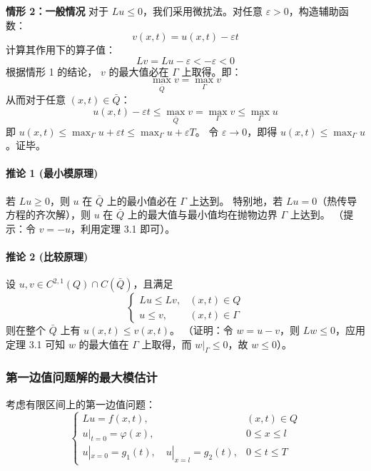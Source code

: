 \documentclass[12pt,a4paper]{ctexart}
\begin{document}
	\textbf{情形 2：一般情况}
	对于 $Lu \leqslant 0$，我们采用微扰法。对任意 $\varepsilon > 0$，构造辅助函数：
	\[
	v(x,t) = u(x,t) - \varepsilon t
	\]
	计算其作用下的算子值：
	\[
	Lv = Lu - \varepsilon < -\varepsilon < 0
	\]
	根据情形 1 的结论， $v$ 的最大值必在 $\Gamma$ 上取得。即：
	\[
	\max_{\bar{Q}} v = \max_{\Gamma} v
	\]
	从而对于任意 $(x,t) \in \bar{Q}$：
	\[
	u(x,t) - \varepsilon t \leqslant \max_{\bar{Q}} v = \max_{\Gamma} v \leqslant \max_{\Gamma} u
	\]
	即 $u(x,t) \leqslant \max_{\Gamma} u + \varepsilon t \leqslant \max_{\Gamma} u + \varepsilon T$。
	令 $\varepsilon \to 0$，即得 $u(x,t) \leqslant \max_{\Gamma} u$。证毕。
	
	\paragraph{推论 1 (最小模原理)}
	若 $Lu \geqslant 0$，则 $u$ 在 $\bar{Q}$ 上的最小值必在 $\Gamma$ 上达到。
	特别地，若 $Lu = 0$（热传导方程的齐次解），则 $u$ 在 $\bar{Q}$ 上的最大值与最小值均在抛物边界 $\Gamma$ 上达到。
	（提示：令 $v = -u$，利用定理 3.1 即可）。
	
	\paragraph{推论 2 (比较原理)}
	设 $u, v \in C^{2,1}(Q) \cap C(\bar{Q})$，且满足
	\[
	\begin{cases}
		Lu \leqslant Lv, & (x,t) \in Q \\
		u \leqslant v, & (x,t) \in \Gamma
	\end{cases}
	\]
	则在整个 $\bar{Q}$ 上有 $u(x,t) \leqslant v(x,t)$。
	（证明：令 $w = u - v$，则 $Lw \leqslant 0$，应用定理 3.1 可知 $w$ 的最大值在 $\Gamma$ 上取得，而 $w|_\Gamma \leqslant 0$，故 $w \leqslant 0$）。
	
	\subsubsection{第一边值问题解的最大模估计}
	
	考虑有限区间上的第一边值问题：
	\begin{equation}
		\begin{cases}
			Lu = f(x,t), & (x,t) \in Q \\
			u|_{t=0} = \varphi(x), & 0 \leqslant x \leqslant l \\
			u|_{x=0} = g_1(t), \quad u|_{x=l} = g_2(t), & 0 \leqslant t \leqslant T
		\end{cases}
	\end{equation}
	
\end{document}

